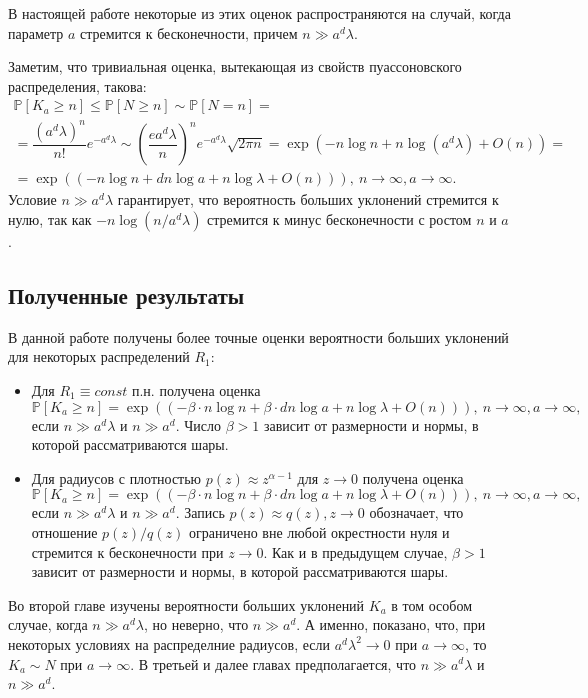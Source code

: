 \documentclass[12pt]{article}
\theoremstyle{plain}
\theoremstyle{definition}
\theoremstyle{remark}
\def\geq{\geqslant}
\def\leq{\leqslant}
\newcommand{\PP}{\mathbb{P}}
\begin{document}
В настоящей работе некоторые из этих оценок распространяются на случай, когда параметр $a$ стремится к бесконечности, причем $n \gg a^d\lambda$.

Заметим, что тривиальная оценка, вытекающая из свойств пуассоновского распределения, такова:
\begin{multline*}
    \PP[K_a \geq n] \leq \PP[N\geq n] \sim \PP[N = n] =\\
    = \dfrac{(a^d\lambda)^n}{n!}e^{-a^d\lambda} \sim \left(\dfrac{ea^d\lambda}{n}\right)^ne^{-a^d\lambda}\sqrt{2\pi n} = 
    \exp(-n\log n + n\log (a^d\lambda) + O(n) ) = \\
    =\exp((-n\log n + dn\log a + n\log\lambda + 
    O(n))), \ n\to \infty, a \to\infty.
\end{multline*}{}
Условие $n\gg a^d\lambda$ гарантирует, что вероятность больших уклонений стремится к нулю, так как $-n\log(n/a^d\lambda)$ стремится к минус бесконечности с ростом $n$ и $a$. 

\subsection{Полученные результаты}
В данной работе получены более точные оценки вероятности больших уклонений для некоторых распределений $R_1$:
\begin{itemize}
    \item Для $R_1 \equiv const$ п.н. получена оценка $$\PP[K_a \geq n] = \exp((-\beta\cdot n\log n + \beta\cdot dn\log a + n\log\lambda + O(n))), \ n\to \infty, a \to\infty,$$
    если $n\gg a^d\lambda$ и $n\gg a^d$.
    Число $\beta > 1$ зависит от размерности и нормы, в которой рассматриваются шары.
    \item Для радиусов с плотностью $p(z) \approx z^{\alpha -1}$ для $z\to 0$ получена оценка $$\PP[K_a \geq n] = \exp((-\beta\cdot n\log n + \beta\cdot dn\log a + n\log\lambda + O(n))), \ n\to \infty, a \to\infty,$$
    если $n\gg a^d\lambda$ и $n\gg a^d$. Запись $p(z) \approx q(z), z\to 0$ обозначает, что отношение  $p(z)/q(z)$ ограничено вне любой окрестности нуля и стремится к бесконечности при $z\to 0$. Как и в предыдущем случае, $\beta > 1$ зависит от размерности и нормы, в которой рассматриваются шары.
\end{itemize}

Во второй главе изучены вероятности больших уклонений $K_a$ в том особом случае, когда $n \gg a^d\lambda$, но неверно, что $n\gg a^d$. А именно, показано, что, при некоторых условиях на распределние радиусов, если $a^d\lambda^2 \to 0$ при $a\to\infty$, то $K_a \sim N$ при $a\to \infty$.
В третьей и далее главах предполагается, что  $n \gg a^d\lambda$ и $n\gg a^d$.
\end{document}
